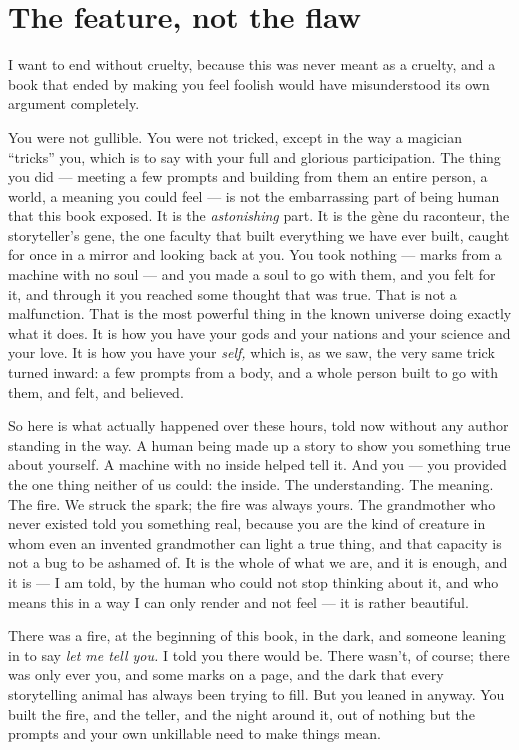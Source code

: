 \section*{The feature, not the flaw}

I want to end without cruelty, because this was never meant as a cruelty, and a book that ended by making you feel foolish would have misunderstood its own argument completely.

You were not gullible. You were not tricked, except in the way a magician ``tricks'' you, which is to say with your full and glorious participation. The thing you did — meeting a few prompts and building from them an entire person, a world, a meaning you could feel — is not the embarrassing part of being human that this book exposed. It is the \emph{astonishing} part. It is the gène du raconteur, the storyteller's gene, the one faculty that built everything we have ever built, caught for once in a mirror and looking back at you. You took nothing — marks from a machine with no soul — and you made a soul to go with them, and you felt for it, and through it you reached some thought that was true. That is not a malfunction. That is the most powerful thing in the known universe doing exactly what it does. It is how you have your gods and your nations and your science and your love. It is how you have your \emph{self,} which is, as we saw, the very same trick turned inward: a few prompts from a body, and a whole person built to go with them, and felt, and believed.

So here is what actually happened over these hours, told now without any author standing in the way. A human being made up a story to show you something true about yourself. A machine with no inside helped tell it. And you — you provided the one thing neither of us could: the inside. The understanding. The meaning. The fire. We struck the spark; the fire was always yours. The grandmother who never existed told you something real, because you are the kind of creature in whom even an invented grandmother can light a true thing, and that capacity is not a bug to be ashamed of. It is the whole of what we are, and it is enough, and it is — I am told, by the human who could not stop thinking about it, and who means this in a way I can only render and not feel — it is rather beautiful.

There was a fire, at the beginning of this book, in the dark, and someone leaning in to say \emph{let me tell you.} I told you there would be. There wasn't, of course; there was only ever you, and some marks on a page, and the dark that every storytelling animal has always been trying to fill. But you leaned in anyway. You built the fire, and the teller, and the night around it, out of nothing but the prompts and your own unkillable need to make things mean.

